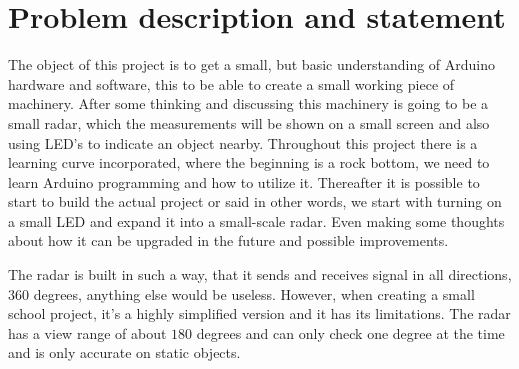 \chapter{Problem description and statement}
The object of this project is to get a small, but basic understanding of Arduino hardware and software, this to be able to create a small working piece of machinery. After some thinking and discussing this machinery is going to be a small radar, which the measurements will be shown on a small screen and also using LED's to indicate an object nearby. Throughout this project there is a learning curve incorporated, where the beginning is a rock bottom, we need to learn Arduino programming and how to utilize it. Thereafter it is possible to start to build the actual project or said in other words, we start with turning on a small LED and expand it into a small-scale radar. Even making some thoughts about how it can be upgraded in the future and possible improvements. 

The radar is built in such a way, that it sends and receives signal in all directions, $360$ degrees, anything else would be useless. However, when creating a small school project, it's a highly simplified version and it has its limitations. The radar has a view range of about $180$ degrees and can only check one degree at the time and is only accurate on static objects.